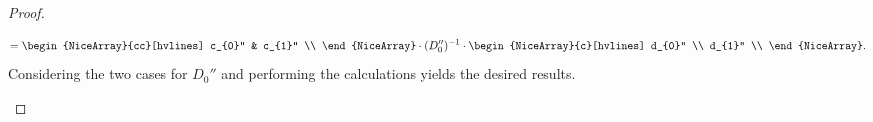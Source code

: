\begin{proof}
\begin{enumerate}
\[            = \begin{NiceArray}{cc}[hvlines] c_{0}'' & c_{1}'' \\ \end{NiceArray} \cdot (D_{0}'')^{-1} \cdot \begin{NiceArray}{c}[hvlines] d_{0}'' \\ d_{1}'' \\ \end{NiceArray}.
        \]
        Considering the two cases for $D_{0}''$ and performing the calculations yields the desired results.


\end{enumerate}
\end{proof}
